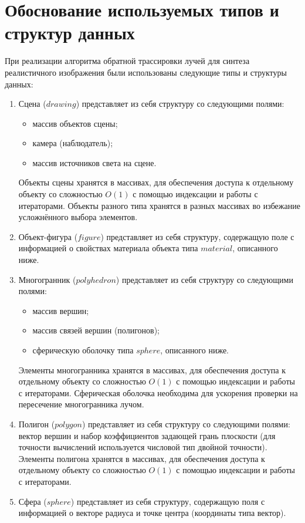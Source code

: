 \section{Обоснование используемых типов и структур данных}
При реализации алгоритма обратной трассировки лучей для синтеза реалистичного изображения были использованы следующие типы и структуры данных:
\begin{enumerate}[label={\arabic*)}]
	\item Сцена ($drawing$) представляет из себя структуру со следующими полями: \begin{itemize}
		\item массив объектов сцены;
		\item камера (наблюдатель);
		\item массив источников света на сцене.
	    \end{itemize}
	Объекты сцены хранятся в массивах, для обеспечения доступа к отдельному объекту со сложностью $O(1)$ с помощью индексации и работы с итераторами. Объекты разного типа хранятся в разных массивах во избежание усложнённого выбора элементов.
	\item Объект-фигура ($figure$) представляет из себя структуру, содержащую поле с информацией о свойствах материала объекта типа $material$, описанного ниже.
	\item Многогранник ($polyhedron$) представляет из себя структуру со следующими полями: \begin{itemize}
		\item массив вершин;
		\item массив связей вершин (полигонов);
		\item сферическую оболочку типа $sphere$, описанного ниже.
	    \end{itemize}
	Элементы многогранника хранятся в массивах, для обеспечения доступа к отдельному объекту со сложностью $O(1)$ с помощью индексации и работы с итераторами. Сферическая оболочка необходима для ускорения проверки на пересечение многогранника лучом.
	\item Полигон ($polygon$) представляет из себя структуру со следующими полями: вектор вершин и набор коэффициентов задающей грань плоскости (для точности вычислений используется числовой тип двойной точности). Элементы полигона хранятся в массивах, для обеспечения доступа к отдельному объекту со сложностью $O(1)$ с помощью индексации и работы с итераторами.
	\item Сфера ($sphere$) представляет из себя структуру, содержащую поля с информацией о векторе радиуса и точке центра (координаты типа вектор).

\end{enumerate}
